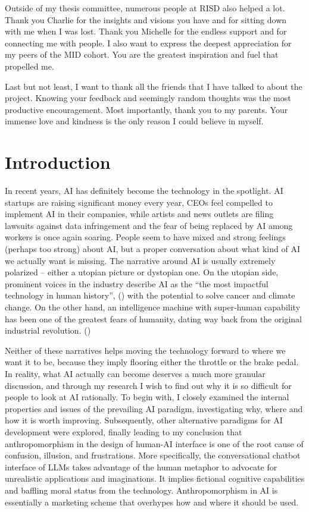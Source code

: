 \documentclass[12pt]{article}
\begin{document}
Outside of my thesis committee, numerous people at RISD also helped a lot. Thank you Charlie for the insights and visions you have and for sitting down with me when I was lost. Thank you Michelle for the endless support and for connecting me with people. I also want to express the deepest appreciation for my peers of the MID cohort. You are the greatest inspiration and fuel that propelled me.

Last but not least, I want to thank all the friends that I have talked to about the project. Knowing your feedback and seemingly random thoughts was the most productive encouragement. Most importantly, thank you to my parents. Your immense love and kindness is the only reason I could believe in myself.
\newpage

\tableofcontents
\newpage
{}
\section{Introduction}
In recent years, AI has definitely become the technology in the spotlight. AI startups are raising significant money every year, CEOs feel compelled to implement AI in their companies, while artists and news outlets are filing lawsuits against data infringement and the fear of being replaced by AI among workers is once again soaring. People seem to have mixed and strong feelings (perhaps too strong) about AI, but a proper conversation about what kind of AI we actually want is missing. The narrative around AI is usually extremely polarized -- either a utopian picture or dystopian one. On the utopian side, prominent voices in the industry describe AI as the ``the most impactful technology in human history'', (\cite{sama}) with the potential to solve cancer and climate change. On the other hand, an intelligence machine with super-human capability has been one of the greatest fears of humanity, dating way back from the original industrial revolution. (\cite{blood})

Neither of these narratives helps moving the technology forward to where we want it to be, because they imply flooring either the throttle or the brake pedal. In reality, what AI actually can become deserves a much more granular discussion, and through my research I wish to find out why it is so difficult for people to look at AI rationally. To begin with, I closely examined the internal properties and issues of the prevailing AI paradigm, investigating why, where and how it is worth improving. Subsequently, other alternative paradigms for AI development were explored, finally leading to my conclusion that anthropomorphism in the design of human-AI interface is one of the root cause of confusion, illusion, and frustrations. More specifically, the conversational chatbot interface of LLMs takes advantage of the human metaphor to advocate for unrealistic applications and imaginations. It implies fictional cognitive capabilities and baffling moral status from the technology. Anthropomorphism in AI is essentially a marketing scheme that overhypes how and where it should be used.
\end{document}
